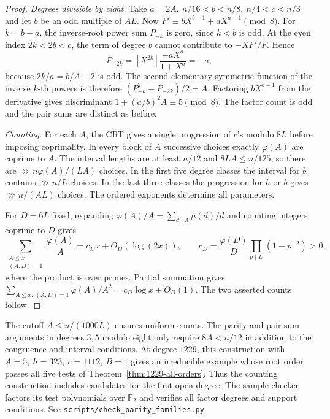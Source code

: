 \documentclass[11pt]{article}
\begin{document}
\begin{proof}
\emph{Degrees divisible by eight.}
Take \(a=2A,\ n/16<b<n/8,\ n/4<c<n/3\) and let \(b\) be an odd
multiple of \(AL\). Now \(F'\equiv bX^{b-1}+aX^{a-1}\pmod8\).
For \(k=b-a\), the inverse-root power sum \(P_{-k}\) is zero,
since \(k<b\) is odd. At the even index \(2k<2b<c\), the term
of degree \(b\) cannot contribute to \(-XF'/F\). Hence
\[
 P_{-2k}=[X^{2k}]\frac{-aX^a}{1+X^a}=-a ,
\]
because \(2k/a=b/A-2\) is odd. The second elementary symmetric
function of the inverse \(k\)-th powers is therefore
\((P_{-k}^2-P_{-2k})/2=A\). Factoring \(bX^{b-1}\) from the
derivative gives discriminant \(1+(a/b)^2 A\equiv5\pmod8\).
The factor count is odd and the pair sums are distinct as before.

\emph{Counting.} For each \(A\), the CRT gives a single progression
of \(c\)'s modulo \(8L\) before imposing coprimality. In every block
of \(A\) successive choices exactly \(\varphi(A)\) are coprime to \(A\).
The interval lengths are at least \(n/12\) and \(8LA\le n/125\), so
there are \(\gg n\varphi(A)/(LA)\) choices. In the first five degree
classes the interval for \(b\) contains \(\gg n/L\) choices. In the
last three classes the progression for \(h\) or \(b\) gives
\(\gg n/(AL)\) choices. The ordered exponents determine all parameters.

For \(D=6L\) fixed, expanding \(\varphi(A)/A=\sum_{d\mid A}\mu(d)/d\)
and counting integers coprime to \(D\) gives
\[
 \sum_{\substack{A\le x\\(A,D)=1}}\frac{\varphi(A)}A
 =c_D x+O_D(\log(2x)),\qquad
 c_D=\frac{\varphi(D)}D\prod_{p\nmid D}(1-p^{-2})>0 ,
\]
where the product is over primes. Partial summation gives
\(\sum_{A\le x,\,(A,D)=1}\varphi(A)/A^2=c_D\log x+O_D(1)\).
The two asserted counts follow.
\end{proof}

The cutoff \(A\le n/(1000L)\) ensures uniform counts. The parity
and pair-sum arguments in degrees \(3,5\) modulo eight only require
\(8A<n/12\) in addition to the congruence and interval conditions.
At degree \(1229\), this construction with
\(A=5,\ h=323,\ c=1112,\ B=1\) gives an irreducible example whose
root order passes all five tests of Theorem~\ref{thm:1229-all-orders}.
Thus the counting construction includes candidates for the first
open degree. The sample checker factors its test polynomials over
\(\mathbb F_2\) and verifies all factor degrees and support conditions.
See \nolinkurl{scripts/check_parity_families.py}.
\end{document}
